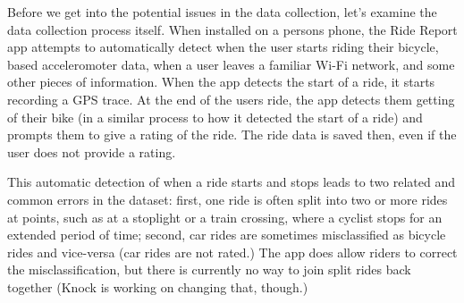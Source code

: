 \documentclass[12pt,twoside]{reedthesis}
\begin{document}
  Before we get into the potential issues in the data collection, let's
  examine the data collection process itself. When installed on a persons
  phone, the Ride Report app attempts to automatically detect when the
  user starts riding their bicycle, based acceleromoter data, when a user
  leaves a familiar Wi-Fi network, and some other pieces of information.
  When the app detects the start of a ride, it starts recording a GPS
  trace. At the end of the users ride, the app detects them getting of
  their bike (in a similar process to how it detected the start of a ride)
  and prompts them to give a rating of the ride. The ride data is saved
  then, even if the user does not provide a rating.
  
  This automatic detection of when a ride starts and stops leads to two
  related and common errors in the dataset: first, one ride is often split
  into two or more rides at points, such as at a stoplight or a train
  crossing, where a cyclist stops for an extended period of time; second,
  car rides are sometimes misclassified as bicycle rides and vice-versa
  (car rides are not rated.) The app does allow riders to correct the
  misclassification, but there is currently no way to join split rides
  back together (Knock is working on changing that, though.)
  
\end{document}

